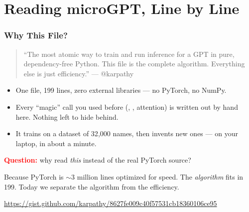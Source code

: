 \section{Reading microGPT, Line by Line}

\begin{frame}
    \frametitle{Why This File?}

    \begin{quote}
        ``The most atomic way to train and run inference for a GPT in pure,
        dependency-free Python. \alert{This file is the complete algorithm.}
        Everything else is just efficiency.'' --- @karpathy
    \end{quote}

    \begin{itemize}
        \item One file, \alert{199 lines}, \alert{zero} external libraries --- no PyTorch, no NumPy.
        \item Every ``magic'' call you used before (, , attention) is \alert{written out by hand} here. Nothing left to hide behind.
        \item It trains on a dataset of 32{,}000 names, then invents new ones --- on your laptop, in about a minute.
    \end{itemize}

    \pause

    \textcolor{red}{\textbf{Question:}} why read \emph{this} instead of the real PyTorch source?

    \pause

    Because PyTorch is $\sim$3 million lines optimized for speed. The \emph{algorithm} fits in 199. Today we separate the algorithm from the efficiency.

    \vfill
    {\footnotesize \url{https://gist.github.com/karpathy/8627fe009c40f57531cb18360106ce95}}
\end{frame}


